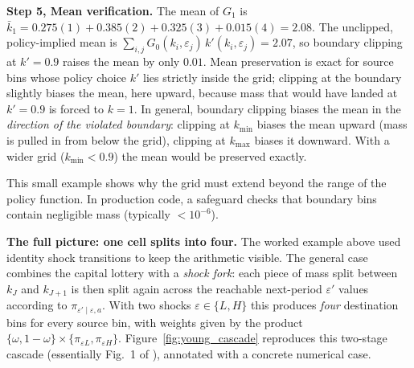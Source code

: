 \documentclass[11pt,a4paper]{report}
\begin{document}
\medskip\noindent
\textbf{Step 5, Mean verification.}  The mean of $G_1$ is $\bar{k}_1 = 0.275(1)+0.385(2)+0.325(3)+0.015(4) = 2.08$.  The unclipped, policy-implied mean is $\sum_{i,j} G_0(k_i,\varepsilon_j)\,k'(k_i,\varepsilon_j) = 2.07$, so boundary clipping at $k' = 0.9$ raises the mean by only $0.01$.  Mean preservation is exact for source bins whose policy choice $k'$ lies strictly inside the grid; clipping at the boundary slightly biases the mean, here upward, because mass that would have landed at $k'=0.9$ is forced to $k=1$.  In general, boundary clipping biases the mean in the \emph{direction of the violated boundary}: clipping at $k_{\min}$ biases the mean upward (mass is pulled in from below the grid), clipping at $k_{\max}$ biases it downward.  With a wider grid ($k_{\min} < 0.9$) the mean would be preserved exactly.

\begin{remarkbox}
This small example shows why the grid must extend beyond the range of the policy function.  In production code, a safeguard checks that boundary bins contain negligible mass (typically $<10^{-6}$).
\end{remarkbox}

\medskip\noindent\textbf{The full picture: one cell splits into four.}
The worked example above used identity shock transitions to keep the arithmetic visible.  The general case combines the capital lottery with a \emph{shock fork}: each piece of mass split between $k_J$ and $k_{J+1}$ is then split again across the reachable next-period $\varepsilon'$ values according to $\pi_{\varepsilon'\mid\varepsilon, a}$.  With two shocks $\varepsilon \in \{L, H\}$ this produces \emph{four} destination bins for every source bin, with weights given by the product $\{\omega, 1-\omega\} \times \{\pi_{\varepsilon L}, \pi_{\varepsilon H}\}$.  Figure~\ref{fig:young_cascade} reproduces this two-stage cascade (essentially Fig.~1 of \citet{young2010}), annotated with a concrete numerical case.
\end{document}
